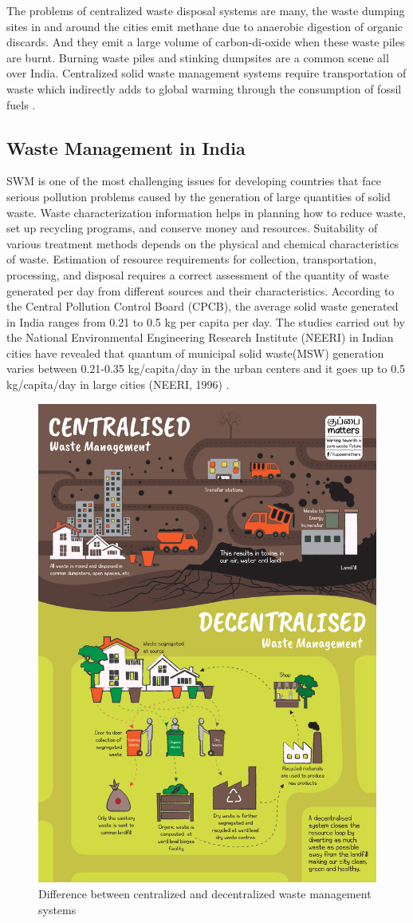 \documentclass[12pt,a4paper]{report}
\begin{document}
The problems of centralized waste disposal systems are many, the waste dumping sites in and around the cities emit methane due to anaerobic digestion of organic discards. And they emit a large volume of carbon-di-oxide when these waste piles are burnt. Burning waste piles and stinking dumpsites are a common scene all over India. Centralized solid waste management systems require transportation of waste which indirectly adds to global warming through the consumption of fossil fuels \cite{swm}.

\subsection{Waste Management in India}

SWM is one of the most challenging issues for developing countries that face serious pollution problems caused by the generation of large quantities of solid waste. Waste characterization information helps in planning how to reduce waste, set up recycling programs, and conserve money and resources. Suitability of various treatment methods depends on the physical and chemical characteristics of waste. Estimation of resource requirements for collection, transportation, processing, and disposal requires a correct assessment of the quantity of waste generated per day from different sources and their characteristics.
According to the Central Pollution Control Board (CPCB), the average solid waste generated in India ranges from 0.21 to 0.5 kg per capita per day.
The studies carried out by the National Environmental Engineering Research Institute (NEERI) in Indian cities have revealed that quantum of municipal solid waste(MSW) generation varies between 0.21-0.35 kg/capita/day in the urban centers and it goes up to 0.5 kg/capita/day in large cities (NEERI, 1996) \cite{neeri}.

\begin{figure}[H]
	\centering
	\includegraphics[width=0.65\linewidth]{cent_decent}
	\caption{Difference between centralized and decentralized waste management systems}
	\label{fig:centdecent}
\end{figure}
\end{document}
